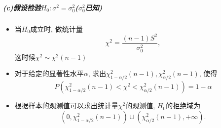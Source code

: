 \subparagraph{(c)假设检验$H_0:\sigma^2=\sigma^2_0$($\sigma_0^2$已知)} 
\begin{itemize}
    \item 当$H_0$成立时, 做统计量$$\chi^2=\frac{(n-1)S^2}{\sigma_0^2}, $$这时候$\chi^2\sim \chi^2(n-1)$
    \item 对于给定的显著性水平$\alpha$, 求出$\chi^2_{1-\alpha/2}(n-1), \chi^2_{  \alpha/2}(n-1)$, 使得$$P(\chi^2_{1-\alpha/2}(n-1)<\chi^2<\chi^2_{  \alpha/2}(n-1))=1-\alpha$$
    \item 根据样本的观测值可以求出统计量$\chi^2$的观测值, $H_0$的拒绝域为$$(0, \chi^2_{1-\alpha/2}(n-1))\cup (\chi^2_{  \alpha/2}(n-1),+\infty).$$
\end{itemize}
